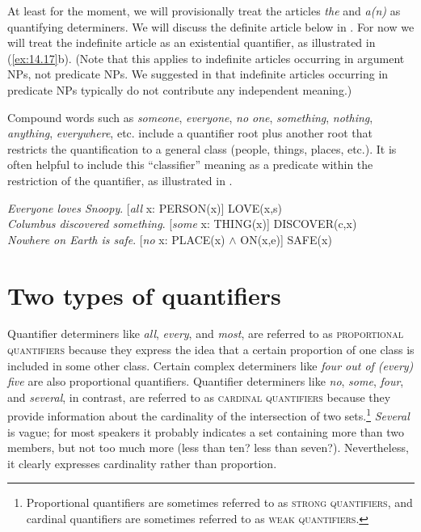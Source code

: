 At least for the moment, we will provisionally treat the articles \textit{the} and \textit{a(n)} as quantifying determiners. We will discuss the definite article below in . For now we will treat the indefinite article as an existential quantifier, as illustrated in (\ref{ex:14.17}b). (Note that this applies to indefinite articles occurring in argument NPs, not predicate NPs. We suggested in  that indefinite articles occurring in predicate NPs typically do not contribute any independent meaning.)



Compound words such as \textit{someone}, \textit{everyone}, \textit{no one}, \textit{something}, \textit{nothing}, \textit{anything}, \textit{everywhere}, etc. include a quantifier root plus another root that restricts the quantification to a general class (people, things, places, etc.). It is often helpful to include this “classifier” meaning as a predicate within the restriction of the quantifier, as illustrated in .


\ea \label{ex:14.18}
\ea \textit{Everyone loves Snoopy}.         \hfill  [\textit{all} x: PERSON(x)] LOVE(x,s)\\
\ex \textit{Columbus discovered something}. \hfill [\textit{some} x: THING(x)] DISCOVER(c,x)\\
\ex \textit{Nowhere on Earth is safe}.      \hfill [\textit{no} x: PLACE(x) $\wedge$ ON(x,e)] SAFE(x)
                       \z
\z

\section{Two types of quantifiers}\label{sec:14.4}

Quantifier determiners like \textit{all}, \textit{every}, and \textit{most}, are referred to as \textsc{proportional quantifiers} because they express the idea that a certain proportion of one class is included in some other class. Certain complex determiners like \textit{four out of (every) five} are also proportional quantifiers. Quantifier determiners like \textit{no}, \textit{some}, \textit{four}, and \textit{several}, in contrast, are referred to as \textsc{cardinal quantifiers} because they provide information about the cardinality of the intersection of two sets.\footnote{Proportional quantifiers are sometimes referred to as \textsc{strong} \textsc{quantifiers}, and cardinal quantifiers are sometimes referred to as \textsc{weak} \textsc{quantifiers}.} \textit{Several} is vague; for most speakers it probably indicates a set containing more than two members, but not too much more (less than ten? less than seven?). Nevertheless, it clearly expresses cardinality rather than proportion.



